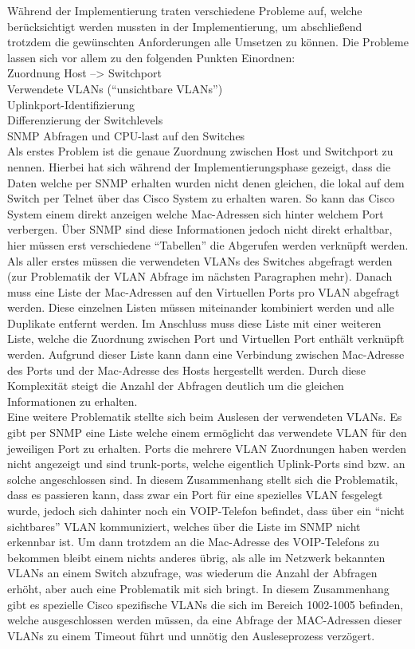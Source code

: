 Während der Implementierung traten verschiedene Probleme auf, welche berücksichtigt werden mussten in der Implementierung, um abschließend trotzdem die gewünschten Anforderungen alle Umsetzen zu können.
Die Probleme lassen sich vor allem zu den folgenden Punkten Einordnen:\\
Zuordnung Host --> Switchport\\
Verwendete VLANs (“unsichtbare VLANs”)\\
Uplinkport-Identifizierung\\
Differenzierung der Switchlevels\\
SNMP Abfragen und CPU-last auf den Switches\\


Als erstes Problem ist die genaue Zuordnung zwischen Host und Switchport zu nennen.
Hierbei hat sich während der Implementierungsphase gezeigt, dass die Daten welche per SNMP erhalten wurden nicht denen gleichen, die lokal auf dem Switch per Telnet über das Cisco System zu erhalten waren. So kann das Cisco System einem direkt anzeigen welche Mac-Adressen sich hinter welchem Port verbergen. Über SNMP sind diese Informationen jedoch nicht direkt erhaltbar, hier müssen erst verschiedene “Tabellen” die Abgerufen werden verknüpft werden. Als aller erstes müssen die verwendeten VLANs des Switches abgefragt werden (zur Problematik der VLAN Abfrage im nächsten Paragraphen mehr). Danach muss eine Liste der Mac-Adressen auf den Virtuellen Ports pro VLAN abgefragt werden. Diese einzelnen Listen müssen miteinander kombiniert werden und alle Duplikate entfernt werden. Im Anschluss muss diese Liste mit einer weiteren Liste, welche die Zuordnung zwischen Port und Virtuellen Port enthält verknüpft werden. Aufgrund dieser Liste kann dann eine Verbindung zwischen Mac-Adresse des Ports und der Mac-Adresse des Hosts hergestellt werden. Durch diese Komplexität steigt die Anzahl der Abfragen deutlich um die gleichen Informationen zu erhalten.\\
Eine weitere Problematik stellte sich beim Auslesen der verwendeten VLANs. Es gibt per SNMP eine Liste welche einem ermöglicht das verwendete VLAN für den jeweiligen Port zu erhalten. Ports die mehrere VLAN Zuordnungen haben werden nicht angezeigt und sind trunk-ports, welche eigentlich Uplink-Ports sind bzw. an solche angeschlossen sind. In diesem Zusammenhang stellt sich die Problematik, dass es passieren kann, dass zwar ein Port für eine spezielles VLAN fesgelegt wurde, jedoch sich dahinter noch ein VOIP-Telefon befindet, dass über ein “nicht sichtbares” VLAN kommuniziert, welches über die Liste im SNMP nicht erkennbar ist. Um dann trotzdem an die Mac-Adresse des VOIP-Telefons zu bekommen bleibt einem nichts anderes übrig, als alle im Netzwerk bekannten VLANs an einem Switch abzufrage, was wiederum die Anzahl der Abfragen erhöht, aber auch eine Problematik mit sich bringt. In diesem Zusammenhang gibt es spezielle Cisco spezifische VLANs die sich im Bereich 1002-1005 befinden, welche ausgeschlossen werden müssen, da eine Abfrage der MAC-Adressen dieser VLANs zu einem Timeout führt und unnötig den Ausleseprozess verzögert.\\

